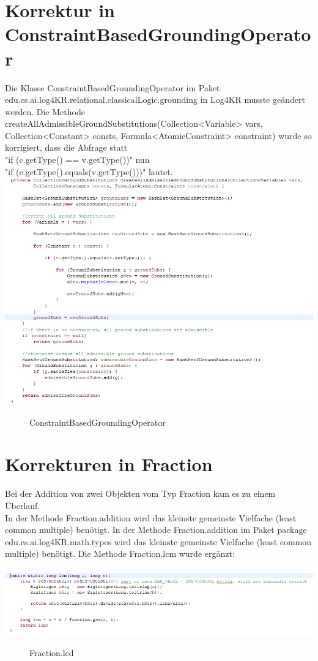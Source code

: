 \documentclass[a4paper, 11pt]{book}
\begin{document}
{\section{Korrektur in ConstraintBasedGroundingOperator}
\label{sec:Korrektur1}
Die Klasse ConstraintBasedGroundingOperator im Paket edu.cs.ai.log4KR.relational.classicalLogic.grounding in Log4KR musste geändert werden. Die Methode createAllAdmissibleGroundSubstitutions(Collection<Variable> vars,
Collection<Constant> consts, Formula<AtomicConstraint> constraint) wurde so korrigiert, dass die Abfrage statt\\
 "{}if (c.getType() == v.getType())"{} 
nun \\
"{}if (c.getType().equals(v.getType()))"{} lautet.\\
\includegraphics[scale = 1.0]{Graphics/Aenderung_1}
\begin{figure}[h]
	\caption{ConstraintBasedGroundingOperator}
\end{figure}


\section{Korrekturen in Fraction} \label{Korrektur_Fraction}
Bei der Addition von zwei Objekten vom Typ Fraction kam es zu einem Überlauf.\\
In der Methode Fraction.addition wird das kleinste gemeinste Vielfache (least common multiple) benötigt. 
In der Methode Fraction.addition im Paket package edu.cs.ai.log4KR.math.types wird das kleinste gemeinste Vielfache (least common multiple) benötigt. 
Die Methode Fraction.lcm wurde ergänzt:\\
\\
\includegraphics[scale = 1.0]{Graphics/Aenderung_221}
\begin{figure}[h]
	\caption{Fraction.lcd}
\end{figure}

}
\end{document}
